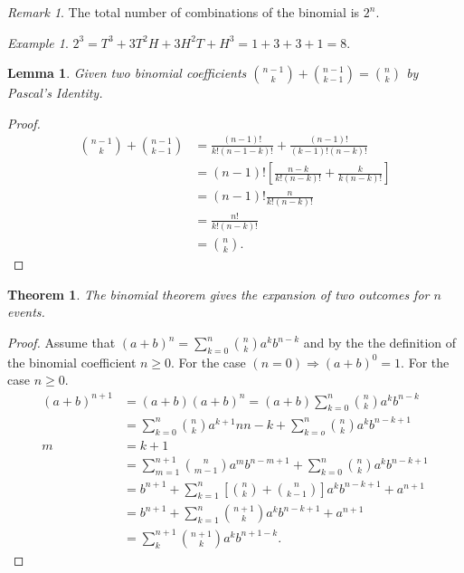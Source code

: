 \documentclass{article}
\theoremstyle{plain}
\newtheorem{lemma}{Lemma}
\newtheorem{theorem}{Theorem}
\theoremstyle{definition}
\theoremstyle{remark}
\newtheorem{remark}{Remark}
\newtheorem{example}{Example}
\begin{document}
\begin{remark}
  The total number of combinations of the binomial is $2^n$.
\end{remark}
\begin{example}
$2^3 = T^3 + 3T^2H + 3H^2T + H^3 = 1 + 3 + 3 + 1 = 8$.
\end{example}
\begin{lemma}
  Given two binomial coefficients $\binom{n-1}{k} + \binom{n-1}{k-1} = \binom{n}{k}$ by Pascal's Identity.
\end{lemma}
\begin{proof}
  \begin{align*}
    \binom{n - 1}{k} + \binom{n - 1}{k - 1} &= \frac{(n-1)!}{k!(n - 1 - k)!} + \frac{(n - 1)!}{(k-1)!(n-k)!} \\
    &= (n - 1)![\frac{n-k}{k!(n-k)!} + \frac{k}{k(n-k)!}] \\
    &= (n - 1)!\frac{n}{k!(n-k)!} \\
    &= \frac{n!}{k!(n - k)!} \\
    &= \binom{n}{k}.
  \end{align*}
\end{proof}
\begin{theorem}
The binomial theorem gives the expansion of two outcomes for $n$ events.
\end{theorem}
\begin{proof}
  Assume that $(a + b)^n = \sum_{k=0}^{n} \binom{n}{k} a^kb^{n-k}$ and by the the definition of the binomial coefficient $n \geq 0$. For the case $(n = 0) \Rightarrow (a + b)^0 = 1$. For the case $n \ge 0$.
  \begin{align*}
    (a + b)^{n+1} &= (a + b)(a + b)^n = (a+b)\sum_{k=0}^{n}\binom{n}{k}a^kb^{n-k} \\
                  &= \sum^{n}_{k=0}\binom{n}{k}a^{k+1}n{n-k} + \sum^{n}_{k=o}\binom{n}{k}a^{k}b^{n-k+1} \\
    m &= k + 1 \\
                  &= \sum^{n+1}_{m=1}\binom{n}{m-1}a^{m}b^{n-m+1}+\sum^{n}_{k=0}\binom{n}{k}a^{k}b^{n-k+1} \\
                  &= b^{n+1}+\sum^{n}_{k=1}[\binom{n}{k} + \binom{n}{k-1}]a^kb^{n-k+1}+a^{n+1}\\
                  &= b^{n+1}+\sum^{n}_{k=1}\binom{n+1}{k}a^{k}b^{n-k+1}+a^{n+1} \\
                  &= \sum^{n+1}_{k}\binom{n+1}{k}a^{k}b^{n+1-k}.
  \end{align*}
\end{proof}
\end{document}
